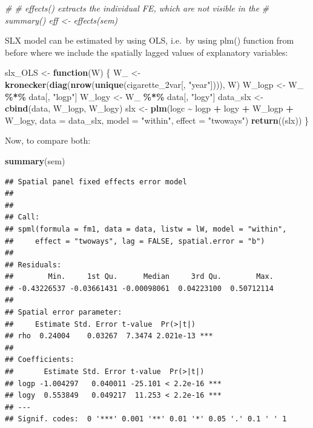 \documentclass[
  a4paper,
]{article}
\newenvironment{Shaded}{\begin{snugshade}}{\end{snugshade}}
\newcommand{\AttributeTok}[1]{\textcolor[rgb]{0.13,0.29,0.53}{#1}}
\newcommand{\CommentTok}[1]{\textcolor[rgb]{0.56,0.35,0.01}{\textit{#1}}}
\newcommand{\ControlFlowTok}[1]{\textcolor[rgb]{0.13,0.29,0.53}{\textbf{#1}}}
\newcommand{\FunctionTok}[1]{\textcolor[rgb]{0.13,0.29,0.53}{\textbf{#1}}}
\newcommand{\NormalTok}[1]{#1}
\newcommand{\OtherTok}[1]{\textcolor[rgb]{0.56,0.35,0.01}{#1}}
\newcommand{\SpecialCharTok}[1]{\textcolor[rgb]{0.81,0.36,0.00}{\textbf{#1}}}
\newcommand{\StringTok}[1]{\textcolor[rgb]{0.31,0.60,0.02}{#1}}
\begin{document}
\begin{Shaded}
\begin{Highlighting}[]
\CommentTok{\# \# \textasciigrave{}effects()\textasciigrave{} extracts the individual FE, which are not visible in the}
\CommentTok{\# \textasciigrave{}summary()\textasciigrave{} eff \textless{}{-} effects(sem)}
\end{Highlighting}
\end{Shaded}

SLX model can be estimated by using OLS, i.e.~by using plm() function
from before where we include the spatially lagged values of explanatory
variables:

\begin{Shaded}
\begin{Highlighting}[]
\NormalTok{slx\_OLS }\OtherTok{\textless{}{-}} \ControlFlowTok{function}\NormalTok{(W) \{}
\NormalTok{    W\_ }\OtherTok{\textless{}{-}} \FunctionTok{kronecker}\NormalTok{(}\FunctionTok{diag}\NormalTok{(}\FunctionTok{nrow}\NormalTok{(}\FunctionTok{unique}\NormalTok{(cigarette\_2var[, }\StringTok{"year"}\NormalTok{]))), W)}
\NormalTok{    W\_logp }\OtherTok{\textless{}{-}}\NormalTok{ W\_ }\SpecialCharTok{\%*\%}\NormalTok{ data[, }\StringTok{"logp"}\NormalTok{]}
\NormalTok{    W\_logy }\OtherTok{\textless{}{-}}\NormalTok{ W\_ }\SpecialCharTok{\%*\%}\NormalTok{ data[, }\StringTok{"logy"}\NormalTok{]}
\NormalTok{    data\_slx }\OtherTok{\textless{}{-}} \FunctionTok{cbind}\NormalTok{(data, W\_logp, W\_logy)}
\NormalTok{    slx }\OtherTok{\textless{}{-}} \FunctionTok{plm}\NormalTok{(logc }\SpecialCharTok{\textasciitilde{}}\NormalTok{ logp }\SpecialCharTok{+}\NormalTok{ logy }\SpecialCharTok{+}\NormalTok{ W\_logp }\SpecialCharTok{+}\NormalTok{ W\_logy, }\AttributeTok{data =}\NormalTok{ data\_slx, }\AttributeTok{model =} \StringTok{"within"}\NormalTok{,}
        \AttributeTok{effect =} \StringTok{"twoways"}\NormalTok{)}
    \FunctionTok{return}\NormalTok{((slx))}
\NormalTok{\}}
\end{Highlighting}
\end{Shaded}

Now, to compare both:

\begin{Shaded}
\begin{Highlighting}[]
\FunctionTok{summary}\NormalTok{(sem)}
\end{Highlighting}
\end{Shaded}

\begin{verbatim}
## Spatial panel fixed effects error model
##  
## 
## Call:
## spml(formula = fm1, data = data, listw = lW, model = "within", 
##     effect = "twoways", lag = FALSE, spatial.error = "b")
## 
## Residuals:
##        Min.     1st Qu.      Median     3rd Qu.        Max. 
## -0.43226537 -0.03661431 -0.00098061  0.04223100  0.50712114 
## 
## Spatial error parameter:
##     Estimate Std. Error t-value  Pr(>|t|)    
## rho  0.24004    0.03267  7.3474 2.021e-13 ***
## 
## Coefficients:
##       Estimate Std. Error t-value  Pr(>|t|)    
## logp -1.004297   0.040011 -25.101 < 2.2e-16 ***
## logy  0.553849   0.049217  11.253 < 2.2e-16 ***
## ---
## Signif. codes:  0 '***' 0.001 '**' 0.01 '*' 0.05 '.' 0.1 ' ' 1
\end{verbatim}
\end{document}
